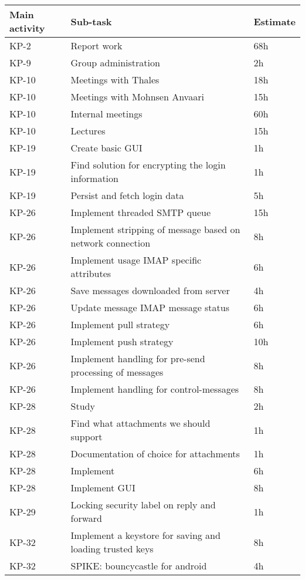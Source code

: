 \begin{longtable}{>{\setlength\hsize{.2\hsize}}X|>{\setlength\hsize{1.5\hsize}}X|>{\setlength\hsize{.1\hsize}}X}
\textbf{Main activity} &  \textbf{Sub-task} & \textbf{Estimate}\\ \hline \hline
KP-2 & Report work & 68h\\ \hline
KP-9 & Group administration & 2h\\ \hline
KP-10 & Meetings with Thales & 18h\\ \hline
KP-10 & Meetings with Mohnsen Anvaari & 15h\\ \hline
KP-10 & Internal meetings & 60h\\ \hline
KP-10 & Lectures & 15h\\ \hline
KP-19	& Create basic GUI & 1h\\ \hline
KP-19	& Find solution for encrypting the login information & 1h\\ \hline
KP-19	& Persist and fetch login data & 5h\\ \hline
KP-26 & Implement threaded SMTP queue & 15h\\ \hline
KP-26 & Implement stripping of message based on network connection & 8h\\ \hline
KP-26	& Implement usage IMAP specific attributes & 6h\\ \hline
KP-26 & Save messages downloaded from server & 4h\\ \hline
KP-26 & Update message IMAP message status & 6h\\ \hline
KP-26 & Implement pull strategy & 6h\\ \hline
KP-26 & Implement push strategy & 10h\\ \hline
KP-26 & Implement handling for pre-send processing of messages & 8h\\ \hline
KP-26 & Implement handling for control-messages & 8h\\ \hline
KP-28	& Study & 2h\\ \hline
KP-28	& Find what attachments we should support & 1h\\ \hline
KP-28	& Documentation of choice for attachments & 1h\\ \hline
KP-28 & Implement & 6h\\ \hline
KP-28 & Implement GUI & 8h\\ \hline
KP-29	& Locking security label on reply and forward & 1h\\ \hline
KP-32	& Implement a keystore for saving and loading trusted keys & 8h\\ \hline
KP-32 & SPIKE: bouncycastle for android & 4h\\ \hline

\end{longtable}
